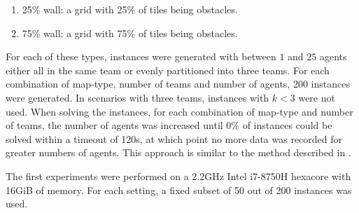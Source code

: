\documentclass[english]{article}
\begin{document}
	\begin{enumerate}
		\item 25\% wall: a grid with 25\% of tiles being obstacles.
		\item 75\% wall: a grid with 75\% of tiles being obstacles. 
	\end{enumerate}
	For each of these types, instances were generated with between $1$ and $25$ agents either all in the same team or evenly partitioned into three teams. For each combination of map-type, number of teams and number of agents, 200 instances were generated. In scenarios with three teams, instances with $k < 3$ were not used. When solving the instances, for each combination of map-type and number of teams, the number of agents was increased until 0\% of instances could be solved within a timeout of 120s, at which point no more data was recorded for greater numbers of agents. This approach is similar to the method described in \cite{stern2019}.
	
	
	
	
	
	
	
	
	
	
	
	
	
	
	
	
	The first experiments were performed on a 2.2GHz Intel i7-8750H hexacore with 16GiB of memory. For each setting, a fixed subset of 50 out of 200 instances was used. %
	
\end{document}
